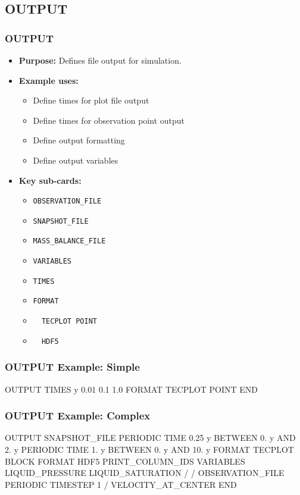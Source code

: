 \subsection{OUTPUT}

\begin{frame}\frametitle{OUTPUT}

\begin{itemize}
\item[] \textbf{Purpose:} Defines file output for simulation.
\item[] \textbf{Example uses:}
\begin{itemize}
  \item Define times for plot file output
  \item Define times for observation point output
  \item Define output formatting
  \item Define output variables
\end{itemize}
\item[] \textbf{Key sub-cards:}
\begin{itemize}
  \item[] \verb|OBSERVATION_FILE|
  \item[] \verb|SNAPSHOT_FILE|
  \item[] \verb|MASS_BALANCE_FILE|
  \item[] \verb|VARIABLES|
  \item[] \verb|TIMES|
  \item[] \verb|FORMAT|
  \item[] \verb|  TECPLOT POINT|
  \item[] \verb|  HDF5|
\end{itemize}
\end{itemize}

\end{frame}

\begin{frame}[fragile]\frametitle{OUTPUT Example: Simple}

\begin{semiverbatim}
OUTPUT
  TIMES y 0.01 0.1 1.0
  FORMAT TECPLOT POINT
END
\end{semiverbatim}

\end{frame}

\begin{frame}[fragile]\frametitle{OUTPUT Example: Complex}

\begin{semiverbatim}
OUTPUT
  SNAPSHOT_FILE
    PERIODIC TIME 0.25 y BETWEEN 0. y AND 2. y
    PERIODIC TIME 1. y BETWEEN 0. y AND 10. y
    FORMAT TECPLOT BLOCK
    FORMAT HDF5
    PRINT_COLUMN_IDS
    VARIABLES
      LIQUID_PRESSURE
      LIQUID_SATURATION
    /
  /
  OBSERVATION_FILE
    PERIODIC TIMESTEP 1
  /
  VELOCITY_AT_CENTER
END
\end{semiverbatim}

\end{frame}
